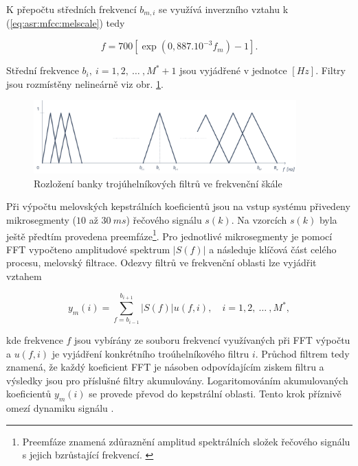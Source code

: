 \noindent K přepočtu středních frekvencí $b_{m,i}$ se využívá inverzního vztahu k (\ref{eq:asr:mfcc:melscale}) tedy

\begin{equation}
  f = 700 \left[ \exp\left( 0,887.10^{-3} f_m \right) - 1 \right].
  \label{eq:asr:mfcc:melscale:inverse}
\end{equation}

\noindent Střední frekvence $b_i,\ i=1,2,\ \dots\ , M^{*}+1$ jsou vyjádřené v jednotce $[Hz]$. Filtry jsou rozmístěny nelineárně viz obr. \ref{fig:asr:mfcc:bank:hz}.

\begin{figure}[hbpt]
  \centering
  \includegraphics[width=0.9\textwidth]{./ch4-asr/img/filter_bank-hz.pdf}
  \caption{Rozložení banky trojúhelníkových filtrů ve frekvenční škále}
  \label{fig:asr:mfcc:bank:hz}
\end{figure}

Při výpočtu melovských kepstrálních koeficientů jsou na vstup systému přivedeny mikrosegmenty ($10$ až $30\ ms$) řečového signálu $s(k)$. Na vzorcích $s(k)$ byla ještě předtím provedena preemfáze\footnote{Preemfáze znamená zdůraznění amplitud spektrálních složek řečového signálu s jejich bzrůstající frekvencí. \cite{Psutka2006}}. Pro jednotlivé mikrosegmenty je pomocí FFT vypočteno amplitudové spektrum $\left| S(f) \right|$ a následuje klíčová část celého procesu, melovský filtrace. Odezvy filtrů ve frekvenční oblasti lze vyjádřit vztahem

\begin{equation}
  y_m(i) = \sum_{f=b_{i-1}}^{b_{i+1}} \left| S(f) \right| u\left(f, i\right),  \quad i = 1, 2,\ \dots\ ,M^{*},
  \label{eq:asr:mfcc:freq:responce}
\end{equation}

\noindent kde frekvence $f$ jsou vybírány ze souboru frekvencí využívaných při FFT výpočtu a $u(f, i)$ je vyjádření konkrétního troúhelníkového filtru $i$. Průchod filtrem tedy znamená, že každý koeficient FFT je násoben odpovídajícím ziskem filtru a výsledky jsou pro příslušné filtry akumulovány. Logaritomováním akumulovaných koeficientů $y_{m}(i)$ se provede převod do kepstrální oblasti. Tento krok příznivě omezí dynamiku signálu \cite{Benesty2007}.

